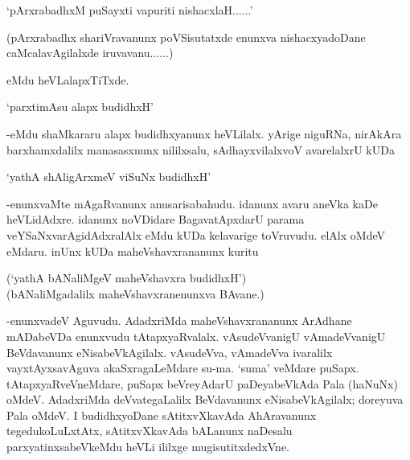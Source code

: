 \begin{shloka}
`pArxrabadhxM puSayxti vapuriti nishacxlaH......'
\end{shloka}

(pArxrabadhx shariVravanunx poVSisutatxde enunxva nishacxyadoDane caMcalavAgilalxde iruvavanu......)

eMdu heVLalapxTiTxde.

\begin{shloka}
`parxtimAsu alapx budidhxH'
\end{shloka}

-eMdu shaMkararu alapx budidhxyanunx heVLilalx. yArige niguRNa, nirAkAra barxhamxdalilx manasasxnunx nililxsalu, sAdhayxvilalxvoV avarelalxrU kUDa

\begin{shloka}
`yathA shAligArxmeV viSuNx budidhxH'
\end{shloka}

-enunxvaMte mAgaRvanunx anusarisabahudu. idanunx avaru aneVka kaDe heVLidAdxre. idanunx noVDidare BagavatApxdarU parama veYSaNxvarAgidAdxralAlx eMdu kUDa kelavarige toVruvudu. elAlx oMdeV eMdaru. inUnx kUDa maheVshavxrananunx kuritu


\begin{shloka}
(`yathA bANaliMgeV maheVshavxra budidhxH')\\
(bANaliMgadalilx maheVshavxranenunxva BAvane.)
\end{shloka}

-enunxvadeV Aguvudu. AdadxriMda maheVshavxrananunx ArAdhane mADabeVDa enunxvudu tAtapxyaRvalalx. vAsudeVvanigU vAmadeVvanigU BeVdavanunx eNisabeVkAgilalx. vAsudeVva, vAmadeVva ivaralilx vayxtAyxsavAguva akaSxragaLeMdare su-ma. `suma' veMdare puSapx. tAtapxyaRveVneMdare, puSapx beVreyAdarU paDeyabeVkAda Pala (haNuNx) oMdeV. AdadxriMda deVvategaLalilx BeVdavanunx eNisabeVkAgilalx; doreyuva Pala oMdeV. I budidhxyoDane sAtitxvXkavAda AhAravanunx tegedukoLuLxtAtx, sAtitxvXkavAda bALanunx naDesalu parxyatinxsabeVkeMdu heVLi ililxge mugisutitxdedxVne.















































